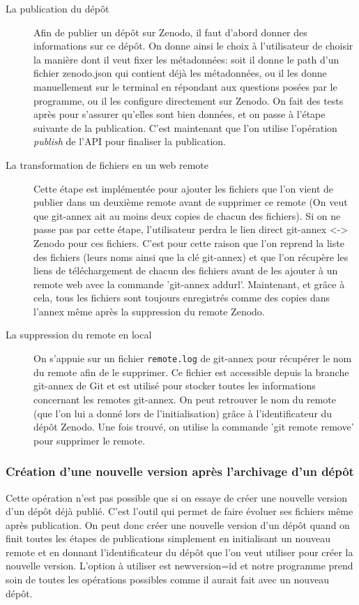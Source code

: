 \documentclass[11pt]{article}
\begin{document}
\begin{description}
\item[{La publication du dépôt}] Afin de publier un dépôt sur Zenodo, il faut d'abord donner des
informations sur ce dépôt. On donne ainsi le choix à l'utilisateur
de choisir la manière dont il veut fixer les métadonnées: soit il
donne le path d'un fichier zenodo.json qui contient déjà les
métadonnées, ou il les donne manuellement sur le terminal en
répondant aux questions posées par le programme, ou il les configure
directement sur Zenodo. On fait des tests après pour s'assurer
qu'elles sont bien données, et on passe à l'étape suivante de la 
publication. C'est maintenant que l'on utilise l'opération \emph{publish}
de l'API pour finaliser la publication.

\item[{La transformation de fichiers en un web remote}] Cette étape est implémentée pour ajouter les fichiers que l'on vient
de publier dans un deuxième remote avant de supprimer ce remote (On
veut que git-annex ait au moins deux copies de chacun des
fichiers). Si on ne passe pas par cette étape, l'utilisateur perdra le
lien direct git-annex <-> Zenodo pour ces fichiers.
C'est pour cette raison que l'on reprend la liste des fichiers
(leurs noms ainsi que la clé git-annex) et que l'on récupère les
liens de téléchargement de chacun des fichiers avant de les ajouter
à un remote web avec la commande 'git-annex addurl'.
Maintenant, et grâce à cela, tous les fichiers sont toujours
enregistrés comme des copies dans l'annex même après la suppression
du remote Zenodo.

\item[{La suppression du remote en local}] On s'appuie sur un fichier \texttt{remote.log} de git-annex pour récupérer le
nom du remote afin de le supprimer. Ce fichier est accessible depuis
la branche git-annex de Git et est utilisé pour stocker toutes les
informations concernant les remotes git-annex.
On peut retrouver le nom du remote (que l'on lui a donné lors de
l'initialisation) grâce à l'identificateur du dépôt Zenodo. Une fois
trouvé, on utilise la commande 'git remote remove' pour supprimer le
remote.
\end{description}

\subsubsection{Création d'une nouvelle version après l'archivage d'un dépôt}
\label{sec:orgfba2c1b}
Cette opération n'est pas possible que si on essaye de créer une
nouvelle version d'un dépôt déjà publié. C'est l'outil qui permet de
faire évoluer ses fichiers même après publication.
On peut donc créer une nouvelle version d'un dépôt quand on finit
toutes les étapes de publications simplement en initialisant un
nouveau remote et en donnant l'identificateur du dépôt que l'on veut
utiliser pour créer la nouvelle version.
L'option à utiliser est newversion=id et notre programme prend soin
de toutes les opérations possibles comme il aurait fait avec un
nouveau dépôt. 
\end{document}

